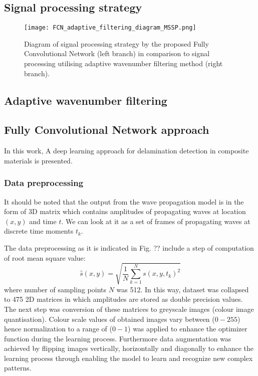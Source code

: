 \documentclass[preprint,9pt]{elsarticle}
\begin{document}
\subsection{Signal processing strategy}
\begin{figure}
	\centering
	\texttt{[image: FCN\_adaptive\_filtering\_diagram\_MSSP.png]}
	\caption{Diagram of signal processing strategy by the proposed Fully Convolutional Network (left branch) in comparison to signal processing utilising adaptive wavenumber filtering method (right branch). }
	\label{fig:sig_proc_strategy}
\end{figure}

\subsection{Adaptive wavenumber filtering}

\subsection{Fully Convolutional Network approach}
In this work, A deep learning approach for delamination detection in composite materials is presented. 
\subsubsection{Data preprocessing}
It should be noted that the output from the wave propagation model is in the form of 3D matrix which contains amplitudes of propagating waves at location \((x, y)\) and time \(t\). We can look at it as a set of frames of propagating waves at discrete time moments \(t_k\).

The data preprocessing as it is indicated in Fig. ?? include a step of computation of root mean square value:
\begin{equation}
\hat{s}(x,y) = \sqrt{\frac{1}{N}\sum_{k=1}^{N} s(x,y,t_k)^2}
\end{equation}
where number of sampling points \(N\) was 512.
In this way, dataset was collapsed to 475 2D matrices in which amplitudes are stored as double precision values.
The next step was conversion of these matrices to greyscale images (colour image quantisation).
Colour scale values of obtained images vary between (\(0 - 255\)) hence normalization
to a range of (\(0-1\)) was applied to enhance the optimizer function during the learning process. 
Furthermore data augmentation was achieved by flipping images vertically, horizontally and diagonally to enhance the learning process through enabling the model to learn and recognize new complex patterns.
\end{document}
